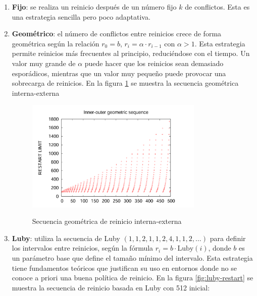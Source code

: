 \begin{enumerate}
    \item \textbf{Fijo}: se realiza un reinicio después de un número fijo $k$ de conflictos. Esta es una estrategia sencilla pero poco adaptativa.

    \item \textbf{Geométrico}: el número de conflictos entre reinicios crece de forma geométrica según la relación $r_0 = b$, $r_i = \alpha \cdot r_{i-1}$ con $\alpha > 1$. Esta estrategia permite reinicios más frecuentes al principio, reduciéndose con el tiempo. Un valor muy grande de $\alpha$ puede hacer que los reinicios sean demasiado esporádicos, mientras que un valor muy pequeño puede provocar una sobrecarga de reinicios. En la figura \ref{fig:geom-restart} se muestra la secuencia geométrica interna-externa
    
    \begin{figure}[ht]
        \centering
        \includegraphics[width=0.8\textwidth]{Graphics/geom_restart.png}
        \caption{Secuencia geom\'etrica de reinicio interna-externa}
        \cite{oliveras2009dpll_cdcl}
        \label{fig:geom-restart}
    \end{figure}

    \item \textbf{Luby}: utiliza la secuencia de Luby $(1,1,2,1,1,2,4,1,1,2,\dots)$ para definir los intervalos entre reinicios, según la fórmula $r_i = b \cdot \text{Luby}(i)$, donde $b$ es un parámetro base que define el tamaño mínimo del intervalo. Esta estrategia tiene fundamentos teóricos que justifican su uso en entornos donde no se conoce a priori una buena política de reinicio. En la figura \ref{fig:luby-restart} se muestra la secuencia de reinicio basada en Luby con 512 inicial:
    

\end{enumerate}
